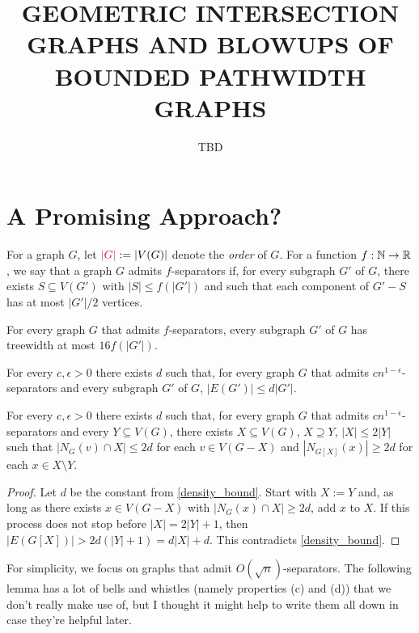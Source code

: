 \documentclass{patmorin}
\title{\MakeUppercase{\boldmath Geometric Intersection Graphs and Blowups of Bounded Pathwidth Graphs}}
\author{TBD}
\date{}
\makeatletter
\renewcommand{\ge}{\geqslant}
\renewcommand{\le}{\leqslant}
\newcommand{\defin}[1]{\emph{\textcolor{brightmaroon}{#1}}}
\def\mathcolor#1#{\@mathcolor{#1}}
\def\@mathcolor#1#2#3{%
  \protect\leavevmode
  \begingroup
    \color#1{#2}#3%
  \endgroup
}
\newcommand{\mathdefin}[1]{\mathcolor{brightmaroon}{#1}}
\makeatother
\begin{document}
\maketitle

\section{A Promising Approach?}

For a graph $G$, let $\mathdefin{|G|}:=|V(G)|$ denote the \defin{order} of $G$.  For a function $f:\mathbb{N}\to\mathbb{R}$, we say that a graph $G$ admits $f$-separators if, for every subgraph $G'$ of $G$, there exists $S\subseteq V(G')$ with $|S|\le f(|G'|)$ and such that each component of $G'-S$ has at most $|G'|/2$ vertices.

\begin{thm}\label{dvorak_norin}
  For every graph $G$ that admits $f$-separators, every subgraph $G'$ of $G$ has treewidth at most $16f(|G'|)$.
\end{thm}

\begin{thm}[??]\label{density_bound}
  For every $c,\epsilon >0$ there exists $d$ such that, for every graph $G$ that admits $cn^{1-\epsilon}$-separators and every subgraph $G'$ of $G$, $|E(G')|\le d|G'|$.
\end{thm}

\begin{lem}\label{degree_bounder}
  For every $c,\epsilon >0$ there exists $d$ such that, for every graph $G$ that admits $cn^{1-\epsilon}$-separators and every $Y\subseteq V(G)$, there exists $X\subseteq V(G)$, $X\supseteq Y$, $|X|\le 2|Y|$ such that $|N_G(v)\cap X|\le 2d$ for each $v\in V(G-X)$ and $|N_{G[X]}(x)|\ge 2d$ for each $x\in X\setminus Y$.
\end{lem}

\begin{proof}
  Let $d$ be the constant from \cref{density_bound}.
  Start with $X:=Y$ and, as long as there exists $x\in V(G-X)$ with $|N_G(x)\cap X|\ge 2d$, add $x$ to $X$.  If this process does not stop before $|X|=2|Y|+1$, then $|E(G[X])|> 2d(|Y|+1)=d|X|+d$.  This contradicts \cref{density_bound}.
\end{proof}

For simplicity, we focus on graphs that admit $O(\sqrt{n})$-separators.  The following lemma has a lot of bells and whistles (namely properties (c) and (d)) that we don't really make use of, but I thought it might help to write them all down in case they're helpful later.
\end{document}
